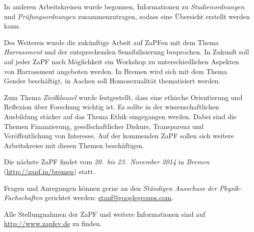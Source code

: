 \documentclass{scrartcl}
\begin{document}
In  anderen Arbeitskreisen wurde begonnen, Informationen zu  \emph{Studienordnungen} und \emph{Pr\"ufungsordnungen} zusammenzutragen,  sodass eine \"Ubersicht erstellt werden kann.

Des Weiteren wurde die zuk\"unftige Arbeit auf ZaPFen mit dem Thema  \emph{Harrassment} und der entsprechenden Sensibilisierung besprochen. In Zukunft soll auf jeder ZaPF nach M\"oglichkeit ein Workshop zu  unterschiedlichen Aspekten von Harrassment angeboten werden. In Bremen wird sich mit dem Thema Gender besch\"aftigt, in Aachen soll Homosexualit\"at thematisiert werden.

Zum  Thema \emph{Zivilklausel}  wurde festgestellt, dass eine ethische Orientierung und Reflexion über Forschung wichtig ist. Es sollte in der  wissenschaftlichen Ausbildung st\"arker auf das Thema Ethik eingegangen werden. Dabei sind die Themen Finanzierung, gesellschaftlicher Diskurs,  Transparenz und Ver\"offentlichung von Interesse. Auf der kommenden ZaPF sollen sich weitere Arbeitskreise mit diesen Themen besch\"aftigen.

\vspace{0.5cm}
Die n\"achste ZaPF findet vom \emph{20.\ bis 23.\ November 2014} in \emph{Bremen} (\href{http://zapf.in/bremen}{\url{http://zapf.in/bremen}}) statt.

Fragen und Anregungen k\"onnen gerne an den \emph{St\"andigen Ausschuss der Physik-Fachschaften} gerichtet werden:
\href{mailto:stapf@googlegroups.com}{\url{stapf@googlegroups.com}}. 

Alle Stellungnahmen der ZaPF und weitere Informationen sind auf \href{http://www.zapfev.de}{\url{http://www.zapfev.de}} zu finden.
\end{document}
